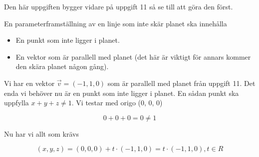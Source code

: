 \documentclass[../../main.tex]{subfiles}
\begin{document}
\begin{solution}{12} 

Den här uppgiften bygger vidare på uppgift 11 så se till att göra den först.

En parameterframställning av en linje som inte skär planet ska innehålla
\begin{itemize}
    \item En punkt som inte ligger i planet.
    \item En vektor som är parallell med planet (det här är viktigt för annars kommer den skära planet någon gång).
\end{itemize}

Vi har en vektor $\vec{v} = (-1, 1, 0)$ som är parallell med planet från uppgift 11. Det enda vi behöver nu är en punkt som inte ligger i planet. En sådan punkt ska uppfylla $x + y + z \neq 1$. Vi testar med origo (0, 0, 0)

\[0 + 0 + 0 = 0 \neq 1\]

Nu har vi allt som krävs

\[(x, y, z) = (0, 0, 0) + t \cdot (-1, 1, 0) = t \cdot (-1, 1, 0), t \in R\]

\end{solution}
\end{document}
